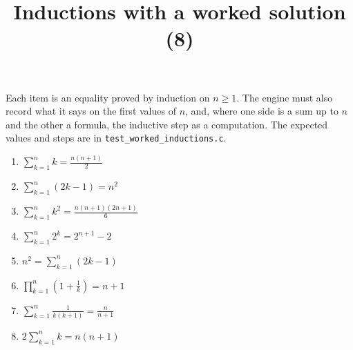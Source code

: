 \documentclass[11pt,a4paper]{article}
\title{Inductions with a worked solution (8)}
\author{}
\date{}
\begin{document}
\maketitle
Each item is an equality proved by induction on $n \ge 1$. The engine must also record what it says on the first values of $n$, and, where one side is a sum up to $n$ and the other a formula, the inductive step as a computation. The expected values and steps are in \texttt{test\_worked\_inductions.c}.

\begin{enumerate}
\item $\displaystyle \sum_{k=1}^{n} k = \frac{n(n+1)}{2}$
\item $\displaystyle \sum_{k=1}^{n} \left(2k - 1\right) = n^{2}$
\item $\displaystyle \sum_{k=1}^{n} k^{2} = \frac{n(n+1)(2n+1)}{6}$
\item $\displaystyle \sum_{k=1}^{n} 2^{k} = 2^{n + 1} - 2$
\item $\displaystyle n^{2} = \sum_{k=1}^{n} \left(2k - 1\right)$
\item $\displaystyle \prod_{k=1}^{n} \left(1 + \frac{1}{k}\right) = n + 1$
\item $\displaystyle \sum_{k=1}^{n} \frac{1}{k(k+1)} = \frac{n}{n+1}$
\item $\displaystyle 2\sum_{k=1}^{n} k = n(n+1)$
\end{enumerate}
\end{document}
